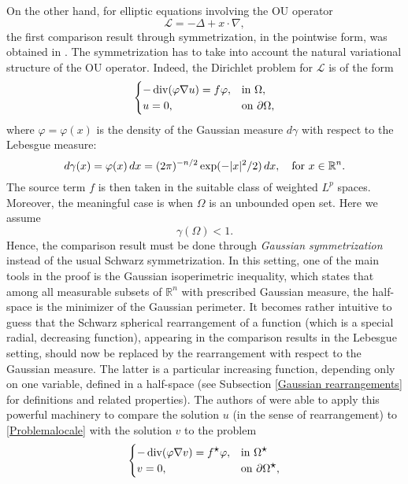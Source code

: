 \documentclass[a4paper,10pt,reqno]{amsart}
\numberwithin{equation}{section}
\begin{document}
On the other hand, for elliptic equations involving the OU operator
$$\mathcal{L}=-\Delta+x\cdot\nabla,$$
the first comparison result through symmetrization, in the pointwise form, was obtained in \cite{Bet-Pster}.
The symmetrization has to take into account the natural variational structure of the OU operator.
Indeed, the Dirichlet problem for $\mathcal{L}$ is of the form
\begin{equation}\label{Problemalocale}
\begin{cases}
-\operatorname{div}(\varphi\nabla u)=f\varphi,&\hbox{in}~\Omega, \\
u=0,&\hbox{on}~\partial\Omega,
\end{cases}
\end{equation}
where $\varphi=\varphi(x)$ is the density of the Gaussian measure $d\gamma$ with respect to the Lebesgue measure:
\begin{equation}\label{eq:Gaussian density}
d\gamma(x)=\varphi(x)\,dx=(2\pi)^{-n/2}\exp(-|x|^2/2)\,dx,\quad\hbox{for}~x\in\mathbb{R}^{n}.
\end{equation}
The source term $f$ is then taken in the suitable class of weighted $L^p$ spaces.
Moreover, the meaningful case is when $\Omega$ is an unbounded open set. Here
we assume
$$\gamma(\Omega)<1.$$
Hence, the comparison result must be done through \emph{Gaussian symmetrization}
instead of the usual Schwarz symmetrization.
In this setting, one of the main tools in the proof is the
Gaussian isoperimetric inequality, which states that among all measurable subsets
of $\mathbb{R}^{n}$ with prescribed Gaussian measure, the half-space is the minimizer of the Gaussian perimeter.
It becomes rather intuitive to guess that the Schwarz spherical rearrangement of a function
(which is a special radial, decreasing function), appearing in the comparison results in the Lebesgue setting,
should now be replaced by the rearrangement with respect to the Gaussian measure.
The latter is a particular increasing function, depending only on one variable, defined in a half-space (see Subsection \ref{Gaussian rearrangements} for
definitions and related properties).
The authors of \cite{Bet-Pster} were able to apply this powerful machinery
to compare the solution $u$ (in the sense of rearrangement) to \eqref{Problemalocale}
with the solution $v$ to the problem
\begin{equation}\label{Problemalocalesymm}
\begin{cases}
-\operatorname{div}(\varphi\nabla v)=f^{\displaystyle\star}\varphi,&\hbox{in}~\Omega^{\displaystyle\star}\\
v=0,&\hbox{on}~\partial\Omega^{\displaystyle\star},
\end{cases}
\end{equation}
\end{document}
